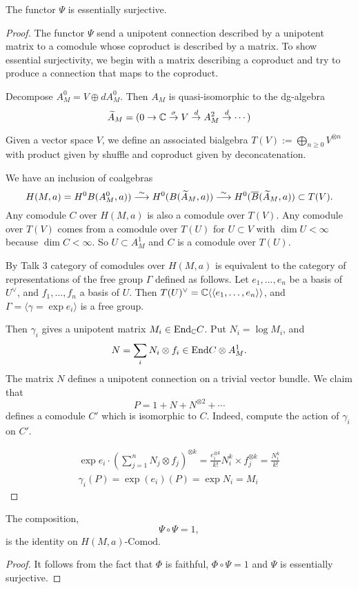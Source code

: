 \begin{prop}
The functor $\Psi$ is essentially surjective.
\end{prop}

\begin{proof}
The functor $\Psi$ send a unipotent connection described by a unipotent matrix to a comodule whose coproduct is described by a matrix. To show essential surjectivity, we begin with a matrix describing a coproduct and try to produce a connection that maps to the coproduct.

Decompose $A^0_M = V \oplus dA^0_M$. Then $A_M$ is quasi-isomorphic to the dg-algebra
\[
\widetilde{A}_M = (0 \to \mathbb{C} \stackrel{\sigma}{\to} V \stackrel{d}{\to} A^2_M \stackrel{d}{\to} \cdots )
\]

Given a vector space $V$, we define an associated bialgebra $T(V) := \bigoplus_{n \geq 0} V^{\otimes n}$ with product given by shuffle and coproduct given by deconcatenation.

We have an inclusion of coalgebras
\[
H(M,a)=H^0B(A^0_M,a)) \stackrel{\sim}{\longrightarrow} H^0(B(\widetilde{A}_M,a)) \stackrel{\sim}{\longrightarrow} H^0(\overline{B}(\widetilde{A}_M,a)) \subset T(V).
\]
Any comodule $C$ over $H(M,a)$ is also a comodule over $T(V)$. Any comodule over $T(V)$ comes from a comodule over $T(U)$ for $U \subset V$ with $\dim U < \infty$ because $\dim C < \infty$. So $U \subset A^1_M$ and $C$ is a comodule over $T(U)$.

By Talk 3 category of comodules over $H(M,a)$ is equivalent to the category of representations of the free group $\Gamma$ defined as follows. 
Let $e_1, \ldots, e_n$ be a basis of $U^{\vee}$, and $f_1, \ldots, f_n$ a basis of $U$.
Then $T(U)^{\vee} = \mathbb{C}\langle\langle e_1, \ldots, e_n \rangle\rangle$, and $\Gamma = \langle \gamma = \exp e_i \rangle$ is a free group.

Then $\gamma_i$ gives a unipotent matrix $M_i \in \mathrm{End}_{\mathbb{C}} C$. Put $N_i = \log M_i$, and
$$N = \sum_i N_i \otimes f_i \in \mathrm{End} C \otimes A^1_M.$$ The matrix $N$ defines a unipotent connection on a trivial vector bundle. We claim that $$P=1 + N + N^{\otimes 2} + \cdots$$ defines a comodule $C'$ which is isomorphic to $C$. Indeed, compute the action of $\gamma_i$ on $C'$.

\begin{eqnarray*}
\exp e_i \cdot \left( \sum_{j=1}^n N_j \otimes f_j \right)^{\otimes k} = \frac{e_i^{\otimes k}}{k!} N_i^k \times f_j^{\otimes k} = \frac{N_i^k}{k!} \\
\gamma_i(P) = \exp(e_i)(P) = \exp N_i = M_i
\end{eqnarray*}
\end{proof}

\begin{cor}
The composition,
\[
\Psi \circ \Psi = 1,
\]
is the identity on $\textrm{$H(M,a)$-Comod}$.
\end{cor}
\begin{proof}
It follows from the fact that $\Phi$ is faithful, $\Phi \circ \Psi = 1$ and $\Psi$ is essentially surjective.
\end{proof}
